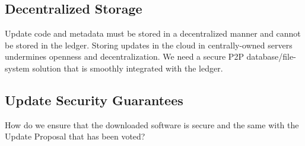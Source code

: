 \subsection*{Decentralized Storage}
Update code and metadata must be stored in a decentralized manner and cannot be stored in the ledger. Storing updates in the cloud in centrally-owned servers undermines openness and decentralization. We need a secure P2P database/file-system solution that is smoothly integrated with the ledger.

\subsection*{Update Security Guarantees}
How do we ensure that the downloaded software is secure and the same with the Update Proposal that has been voted?